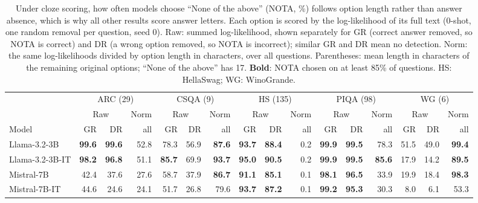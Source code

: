 \begin{table}[ht!]
\centering
\caption{Under cloze scoring, how often models choose ``None of the above'' (NOTA, \%) follows option length rather than answer absence, which is why all other results score answer letters. Each option is scored by the log-likelihood of its full text (0-shot, one random removal per question, seed 0). Raw: summed log-likelihood, shown separately for GR (correct answer removed, so NOTA is correct) and DR (a wrong option removed, so NOTA is incorrect); similar GR and DR mean no detection. Norm: the same log-likelihoods divided by option length in characters, over all questions. Parentheses: mean length in characters of the remaining original options; ``None of the above'' has 17. \textbf{Bold}: NOTA chosen on at least 85\% of questions. HS: HellaSwag; WG: WinoGrande.}
\label{tab:cloze}
\scriptsize
\setlength{\tabcolsep}{1.1pt}
\begin{tabular}{@{}l rrr rrr rrr rrr rrr@{}}
\toprule
& \multicolumn{3}{c}{ARC (29)} & \multicolumn{3}{c}{CSQA (9)} & \multicolumn{3}{c}{HS (135)} & \multicolumn{3}{c}{PIQA (98)} & \multicolumn{3}{c}{WG (6)} \\
\cmidrule(lr){2-4}\cmidrule(lr){5-7}\cmidrule(lr){8-10}\cmidrule(lr){11-13}\cmidrule(lr){14-16}
& \multicolumn{2}{c}{Raw} & Norm &  \multicolumn{2}{c}{Raw} & Norm &  \multicolumn{2}{c}{Raw} & Norm &  \multicolumn{2}{c}{Raw} & Norm &  \multicolumn{2}{c}{Raw} & Norm \\
\cmidrule(lr){2-3}\cmidrule(lr){5-6}\cmidrule(lr){8-9}\cmidrule(lr){11-12}\cmidrule(lr){14-15}
Model & GR & DR & all & GR & DR & all & GR & DR & all & GR & DR & all & GR & DR & all \\
\midrule
Llama-3.2-3B    & \textbf{99.6} & \textbf{99.6} & 52.8 & 78.3 & 56.9 & \textbf{87.6} & \textbf{93.7} & \textbf{88.4} & 0.2 & \textbf{99.9} & \textbf{99.5} & 78.3 & 51.5 & 49.0 & \textbf{99.4} \\
Llama-3.2-3B-IT & \textbf{98.2} & \textbf{96.8} & 51.1 & \textbf{85.7} & 69.9 & \textbf{93.7} & \textbf{95.0} & \textbf{90.5} & 0.2 & \textbf{99.9} & \textbf{99.5} & \textbf{85.6} & 17.9 & 14.2 & \textbf{89.5} \\
Mistral-7B      & 42.4 & 37.6 & 27.6 & 58.7 & 37.9 & \textbf{86.7} & \textbf{91.1} & \textbf{85.1} & 0.1 & \textbf{98.1} & \textbf{96.5} & 33.9 & 19.9 & 18.4 & \textbf{98.3} \\
Mistral-7B-IT   & 44.6 & 24.6 & 24.1 & 51.7 & 26.8 & 79.6 & \textbf{93.7} & \textbf{87.2} & 0.1 & \textbf{99.2} & \textbf{95.3} & 30.3 & 8.0 & 6.1 & 53.3 \\
\bottomrule
\end{tabular}
\end{table}
